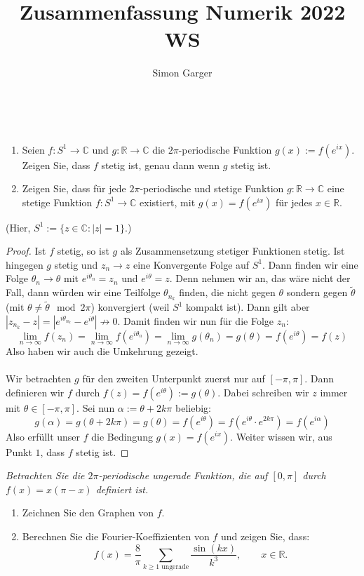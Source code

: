 \documentclass[11pt]{article}
\title{Zusammenfassung Numerik 2022 WS}
\author{Simon Garger}
\newcommand{\R}{\mathbb{R}}
\newcommand{\C}{\mathbb{C}}
\newenvironment{problem}[2][Beispiel]{
    \begin{trivlist}
        \item[\hskip \labelsep {\bfseries #1}\hskip \labelsep {\bfseries #2.}] \itshape}{
    \end{trivlist}\normalshape
}
\begin{document}
    \begin{problem}{1}
        $\quad$
        \begin{enumerate}[label = (\roman{enumi})]
            \item Seien $f:S^1\to\C$ und $g:\R\to\C$ die $2\pi$-periodische Funktion $g(x):=f(e^{ix})$. Zeigen Sie,
            dass $f$ stetig ist, genau dann wenn $g$ stetig ist.
            \item Zeigen Sie, dass für jede $2\pi$-periodische und stetige Funktion $g:\R\to\C$ eine stetige
            Funktion $f:S^1\to\C$ existiert, mit $g(x)=f(e^{ix})$ für jedes $x\in \R$.
        \end{enumerate}
        (Hier, $S^1:= \{z\in\C:|z|=1\}$.)
    \end{problem}

    \begin{proof}
        Ist $f$ stetig, so ist $g$ als Zusammensetzung stetiger Funktionen stetig. Ist hingegen
        $g$ stetig und $z_n\to z$ eine Konvergente Folge auf $S^1$. Dann finden wir eine Folge
        $\theta_n\to\theta$ mit $e^{i\theta_n}=z_n$ und $e^{i\theta}=z$. Denn nehmen wir an, das
        wäre nicht der Fall, dann würden wir eine Teilfolge $\theta_{n_k}$ finden, die nicht gegen $\theta$ sondern
        gegen $\tilde{\theta}$ (mit $\theta\neq \tilde{\theta}\mod 2\pi$) konvergiert (weil $S^1$
        kompakt ist). Dann gilt aber $|z_{n_k}-z|=\left|e^{i\theta_{n_k}}-e^{i\theta}\right|\nrightarrow 0$.
        Damit finden wir nun für die Folge $z_n$:
        $$\lim_{n\to\infty}f(z_n)=\lim_{n\to\infty} f(e^{i\theta_n}) = \lim_{n\to\infty} g(\theta_n)=
        g(\theta)= f(e^{i\theta})=f(z)$$
        Also haben wir auch die Umkehrung gezeigt. \\\\
        Wir betrachten $g$ für den zweiten Unterpunkt zuerst nur auf $[-\pi,\pi]$. Dann definieren wir
        $f$ durch $f(z)=f(e^{i\theta}):= g(\theta)$. Dabei schreiben wir $z$ immer mit $\theta\in [-\pi,\pi]$.
        Sei nun $\alpha:= \theta + 2k\pi$ beliebig:
        $$g(\alpha) = g(\theta + 2k\pi)=g(\theta)=f(e^{i\theta})=f(e^{i\theta}\cdot e^{2k\pi})=
        f(e^{i\alpha})$$
        Also erfüllt unser $f$ die Bedingung $g(x)=f(e^{ix})$. Weiter wissen wir, aus Punkt $1$, dass
        $f$ stetig ist.
    \end{proof}

    \begin{problem}{2}
        Betrachten Sie die $2\pi$-periodische ungerade Funktion, die auf $[0,\pi]$ durch $f(x)=x(\pi-x)$
        definiert ist.
        \begin{enumerate}[label = (\roman{enumi})]
            \item Zeichnen Sie den Graphen von $f$.
            \item Berechnen Sie die Fourier-Koeffizienten von $f$ und zeigen Sie, dass:
            $$f(x)=\frac{8}{\pi}\sum_{k\geq 1\text{  ungerade}}\frac{\sin(kx)}{k^3},\qquad x\in\R.$$
        \end{enumerate}
    \end{problem}
\end{document}
